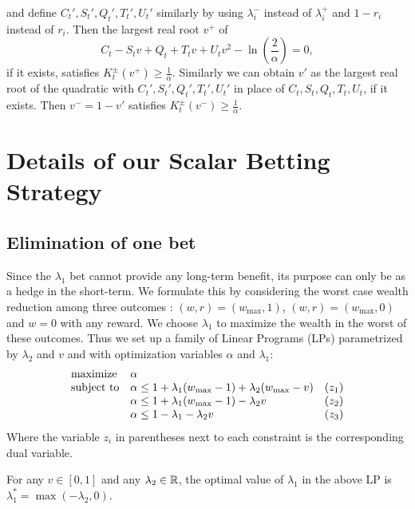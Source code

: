 and define $C_t',S_t',Q_t',T_t',U_t'$ similarly by using $\lambda_i^{-}$ 
instead of $\lambda_i^{+}$ and $1-r_i$ instead of $r_i$. Then
the largest real root $v^{+}$ of
\[
C_t - S_t v + Q_t + T_t v + U_t v^2 - \ln\left(\frac{2}{\alpha}\right) = 0,
\]
if it exists, satisfies $K_t^{\pm}(v^{+})\geq \frac{1}{\alpha}$. Similarly
we can obtain $v'$ as the largest real root of the quadratic
with $C_t',S_t',Q_t',T_t',U_t'$ in place of $C_t,S_t,Q_t,T_t,U_t$,
if it exists. Then $v^{-}=1-v'$ satisfies $K_t^{\pm}(v^{-})\geq \frac{1}{\alpha}$.



\section{Details of our Scalar Betting Strategy}
\subsection{Elimination of one bet} \label{app:betaopt}
Since the $\lambda_1$ bet cannot provide any long-term benefit, its purpose can only be as a hedge in the short-term. 
We formulate this by considering the
worst case wealth reduction among three outcomes :
$(w,r)=(w_{\max},1)$, 
$(w,r)=(w_{\max},0)$ and $w=0$ with any reward. 
We choose $\lambda_1$ to maximize the wealth 
in the worst of these outcomes. Thus we set 
up a family of Linear Programs (LPs) 
parametrized by $\lambda_2$ and $v$ and with optimization variables $\alpha$ and $\lambda_1$:
\begin{equation*}
\begin{array}{ll@{}ll}
\text{maximize}  & \alpha &\\
\text{subject to}& \alpha \leq 1+\lambda_1(w_{\max}-1)+\lambda_2(w_{\max}-v)  & &(z_1) \\
                 & \alpha \leq 1+\lambda_1(w_{\max}-1)-\lambda_2 v            & &(z_2) \\
                 & \alpha \leq 1-\lambda_1-\lambda_2 v                        & &(z_3) \\
\end{array}
\end{equation*}
Where the variable $z_i$ in parentheses next to each constraint is the corresponding dual variable. 
\begin{theorem}
For any $v\in [0,1]$ and any $\lambda_2 \in \mathbb{R}$, the optimal value of $\lambda_1$ in the above LP is $\lambda_1^*=\max(-\lambda_2,0)$.
\end{theorem}
